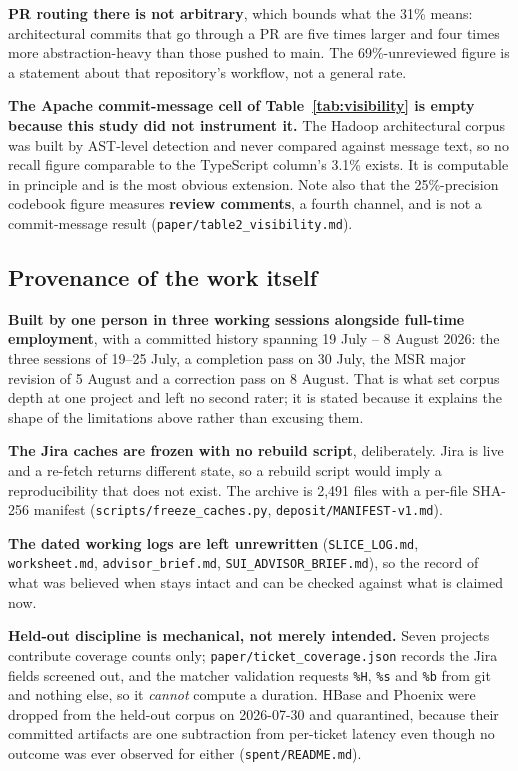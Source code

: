 \documentclass[conference]{IEEEtran}
\begin{document}
\textbf{PR routing there is not arbitrary}, which bounds what the 31\% means: architectural commits that go through a PR are five times larger and four times more abstraction-heavy than those pushed to main. The 69\%-unreviewed figure is a statement about that repository's workflow, not a general rate.

\textbf{The Apache commit-message cell of Table~\ref{tab:visibility} is empty because this study did not instrument it.} The Hadoop architectural corpus was built by AST-level detection and never compared against message text, so no recall figure comparable to the TypeScript column's 3.1\% exists. It is computable in principle and is the most obvious extension. Note also that the 25\%-precision codebook figure measures \textbf{review comments}, a fourth channel, and is not a commit-message result (\texttt{paper/\allowbreak{}table2\_\allowbreak{}visibility.\allowbreak{}md}).

\subsection{Provenance of the work itself}
\label{sec:6.8}

\textbf{Built by one person in three working sessions alongside full-time employment}, with a committed history spanning 19 July -- 8 August 2026: the three sessions of 19--25 July, a completion pass on 30 July, the MSR major revision of 5 August and a correction pass on 8 August. That is what set corpus depth at one project and left no second rater; it is stated because it explains the shape of the limitations above rather than excusing them.

\textbf{The Jira caches are frozen with no rebuild script}, deliberately. Jira is live and a re-fetch returns different state, so a rebuild script would imply a reproducibility that does not exist. The archive is 2,491 files with a per-file SHA-256 manifest (\texttt{scripts/\allowbreak{}freeze\_\allowbreak{}caches.\allowbreak{}py}, \texttt{deposit/\allowbreak{}MANIFEST-\allowbreak{}v1.\allowbreak{}md}).

\textbf{The dated working logs are left unrewritten} (\texttt{SLICE\_\allowbreak{}LOG.\allowbreak{}md}, \texttt{worksheet.\allowbreak{}md}, \texttt{advisor\_\allowbreak{}brief.\allowbreak{}md}, \texttt{SUI\_\allowbreak{}ADVISOR\_\allowbreak{}BRIEF.\allowbreak{}md}), so the record of what was believed when stays intact and can be checked against what is claimed now.

\textbf{Held-out discipline is mechanical, not merely intended.} Seven projects contribute coverage counts only; \texttt{paper/\allowbreak{}ticket\_\allowbreak{}coverage.\allowbreak{}json} records the Jira fields screened out, and the matcher validation requests \texttt{\%H}, \texttt{\%s} and \texttt{\%b} from git and nothing else, so it \emph{cannot} compute a duration. HBase and Phoenix were dropped from the held-out corpus on 2026-07-30 and quarantined, because their committed artifacts are one subtraction from per-ticket latency even though no outcome was ever observed for either (\texttt{spent/\allowbreak{}README.\allowbreak{}md}).
\end{document}
